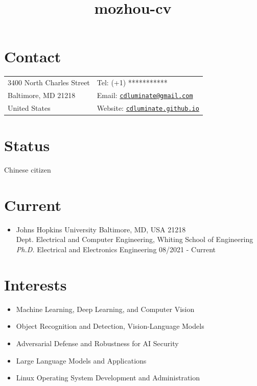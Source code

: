 \documentclass[10pt,margin,line,pifont,palatino,courier]{res}
\newcommand{\email}[1]{\href{mailto:#1}{\tt #1}}
\begin{document}
\title{mozhou-cv}
\begin{resume}

\section{\sc Contact}

\vspace{.05in}
\begin{tabular}{@{}p{2.2in}p{2.2in}}
3400 North Charles Street & Tel: (+1) *********** \\
Baltimore, MD 21218       & Email: \email{cdluminate@gmail.com}\\
United States	          & Website: \href{https://cdluminate.github.io/}{\tt cdluminate.github.io}
\end{tabular}

\section{\sc Status}
Chinese citizen

\section{\sc Current}

\begin{itemize}[leftmargin=*]
\item Johns Hopkins University \hfill Baltimore, MD, USA 21218\\
    Dept. Electrical and Computer Engineering, Whiting School of Engineering\\
	\textit{Ph.D.} Electrical and Electronics Engineering \hfill 08/2021 - Current\\
\end{itemize}

\section{\sc Interests}
\begin{itemize}[noitemsep, leftmargin=*]
	\item Machine Learning, Deep Learning, and Computer Vision
	\item Object Recognition and Detection, Vision-Language Models
	\item Adversarial Defense and Robustness for AI Security
    \item Large Language Models and Applications
	\item Linux Operating System Development and Administration
\end{itemize}
 

\end{resume}
\end{document}

